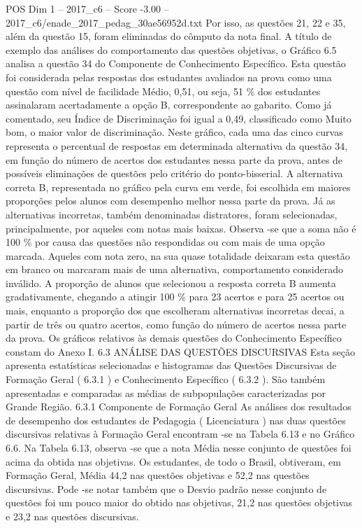 \begin{textsample}{POS Dim 1 – 2017\_c6 – Score -3.00 – 2017\_c6/enade\_2017\_pedag\_30ae56952d.txt}
Por isso, as questões 21, 22 e 35, além da questão 15, foram eliminadas do cômputo da nota final.
A título de exemplo das análises do comportamento das questões objetivas, o Gráfico 6.5 analisa a questão 34 do Componente de Conhecimento Específico.
Esta questão foi considerada pelas respostas dos estudantes avaliados na prova como uma questão com nível de facilidade Médio, 0,51, ou seja, 51 \% dos estudantes assinalaram acertadamente a opção B, correspondente ao gabarito.
Como já comentado, seu Índice de Discriminação foi igual a 0,49, classificado como Muito bom, o maior valor de discriminação.
Neste gráfico, cada uma das cinco curvas representa o percentual de respostas em determinada alternativa da questão 34, em função do número de acertos dos estudantes nessa parte da prova, antes de possíveis eliminações de questões pelo critério do ponto-bisserial.
A alternativa correta B, representada no gráfico pela curva em verde, foi escolhida em maiores proporções pelos alunos com desempenho melhor nessa parte da prova.
Já as alternativas incorretas, também denominadas distratores, foram selecionadas, principalmente, por aqueles com notas mais baixas.
Observa -se que a soma não é 100 \% por causa das questões não respondidas ou com mais de uma opção marcada.
Aqueles com nota zero, na sua quase totalidade deixaram esta questão em branco ou marcaram mais de uma alternativa, comportamento considerado inválido.
A proporção de alunos que selecionou a resposta correta B aumenta gradativamente, chegando a atingir 100 \% para 23 acertos e para 25 acertos ou mais, enquanto a proporção dos que escolheram alternativas incorretas decai, a partir de três ou quatro acertos, como função do número de acertos nessa parte da prova.
Os gráficos relativos às demais questões do Conhecimento Específico constam do Anexo I. 6.3 ANÁLISE DAS QUESTÕES DISCURSIVAS Esta seção apresenta estatísticas selecionadas e histogramas das Questões Discursivas de Formação Geral ( 6.3.1 ) e Conhecimento Específico ( 6.3.2 ).
São também apresentadas e comparadas as médias de subpopulações caracterizadas por Grande Região. 6.3.1 Componente de Formação Geral As análises dos resultados de desempenho dos estudantes de Pedagogia ( Licenciatura ) nas duas questões discursivas relativas à Formação Geral encontram -se na Tabela 6.13 e no Gráfico 6.6.
Na Tabela 6.13, observa -se que a nota Média nesse conjunto de questões foi acima da obtida nas objetivas.
Os estudantes, de todo o Brasil, obtiveram, em Formação Geral, Média 44,2 nas questões objetivas e 52,2 nas questões discursivas.
Pode -se notar também que o Desvio padrão nesse conjunto de questões foi um pouco maior do obtido nas objetivas, 21,2 nas questões objetivas e 23,2 nas questões discursivas.

\end{textsample}
